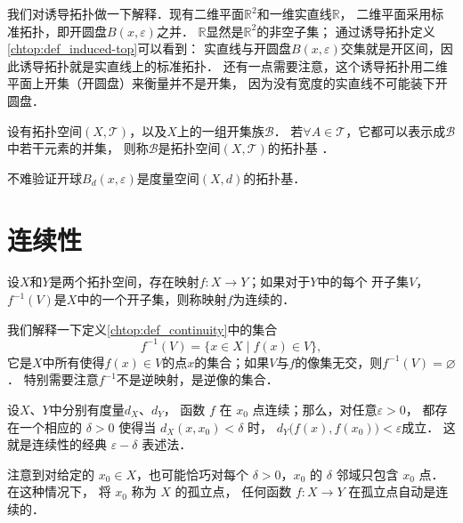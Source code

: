  

我们对诱导拓扑做一下解释．现有二维平面$\mathbb{R}^2$和一维实直线$\mathbb{R}$，
二维平面采用标准拓扑，即开圆盘$B(x,\varepsilon)$之并．
$\mathbb{R}$显然是$\mathbb{R}^2$的非空子集；
通过诱导拓扑定义\ref{chtop:def_induced-top}可以看到：
实直线与开圆盘$B(x,\varepsilon)$交集就是开区间，因此诱导拓扑就是实直线上的标准拓扑．
还有一点需要注意，这个诱导拓扑用二维平面上开集（开圆盘）来衡量并不是开集，
因为没有宽度的实直线不可能装下开圆盘．


\begin{definition}\label{chtop:def_bases}
    设有拓扑空间$(X,\mathscr{T})$，以及$X$上的一组开集族$\mathscr{B}$．
    若$\forall A \in \mathscr{T}$，它都可以表示成$\mathscr{B}$中若干元素的并集，
    则称$\mathscr{B}$是拓扑空间$(X,\mathscr{T})$的{\heiti 拓扑基 }．
\end{definition}

不难验证开球$B_d(x,\varepsilon)$是度量空间$(X,d)$的拓扑基．




\section{连续性}

\begin{definition}\label{chtop:def_continuity}
    设$X$和$Y$是两个拓扑空间，存在映射$f:X\to Y$；如果对于$Y$中的每个
    开子集$V$，$f^{-1}(V)$是$X$中的一个开子集，则称映射$f$为{\heiti 连续的}．
\end{definition}

我们解释一下定义\ref{chtop:def_continuity}中的集合
\begin{equation}
    f^{-1}(V)=\{x\in X \mid  f(x) \in V\},
\end{equation}
它是$X$中所有使得$f(x)\in V$的点$x$的集合；如果$V$与$f$的像集无交，则$f^{-1}(V)=\varnothing$．
特别需要注意$f^{-1}$不是逆映射，是逆像的集合．


设$X$、$Y$中分别有度量$d_X$、$d_Y$，
函数 $f$ 在 $x_0$ 点连续；那么，对任意$\varepsilon>0$，
都存在一个相应的 $\delta>0$ 使得当 $d_X(x, x_0)<\delta$ 时，
$d_Y\bigl(f(x), f(x_0)\bigr)<\varepsilon $成立．
这就是连续性的经典 $\varepsilon-\delta$ 表述法．


注意到对给定的 $x_0 \in X$，也可能恰巧对每个 $\delta>0$，$ x_0$ 的 $\delta$ 邻域只包含 $x_0$ 点．
在这种情况下， 将 $x_0$ 称为 $X$ 的孤立点， 任何函数 $f: X \rightarrow Y$ 在孤立点自动是连续的．



